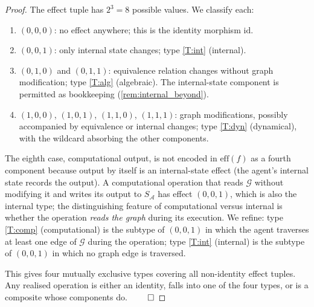 \documentclass[11pt,a4paper]{article}
\theoremstyle{thmstyle}
\theoremstyle{definition}
\theoremstyle{remark}
\newcommand{\Graph}{\mathcal{G}}
\newcommand{\Agent}{\mathcal{A}}
\begin{document}
\begin{proof}
The effect tuple has $2^3 = 8$ possible values. We classify each:
\begin{enumerate}[nosep,leftmargin=*]
\item $(0,0,0)$: no effect anywhere; this is the identity morphism
$\mathrm{id}$.
\item $(0,0,1)$: only internal state changes; type \ref{T:int}
(internal).
\item $(0,1,0)$ and $(0,1,1)$: equivalence relation changes
without graph modification; type \ref{T:alg} (algebraic). The
internal-state component is permitted as bookkeeping
(\cref{rem:internal_beyond}).
\item $(1,0,0)$, $(1,0,1)$, $(1,1,0)$, $(1,1,1)$: graph
modifications, possibly accompanied by equivalence or internal
changes; type \ref{T:dyn} (dynamical), with the wildcard absorbing
the other components.
\end{enumerate}
The eighth case, computational output, is not encoded in
$\mathrm{eff}(f)$ as a fourth component because output by itself
is an internal-state effect (the agent's internal state records the
output). A computational operation that reads $\Graph$ without
modifying it and writes its output to $S_\Agent$ has effect
$(0,0,1)$, which is also the internal type; the distinguishing
feature of computational versus internal is whether the operation
\emph{reads the graph} during its execution. We refine: type
\ref{T:comp} (computational) is the subtype of $(0,0,1)$ in which
the agent traverses at least one edge of $\Graph$ during the
operation; type \ref{T:int} (internal) is the subtype of $(0,0,1)$
in which no graph edge is traversed.

This gives four mutually exclusive types covering all
non-identity effect tuples. Any realised operation is either an
identity, falls into one of the four types, or is a composite
whose components do. $\qed$
\end{proof}
\end{document}
